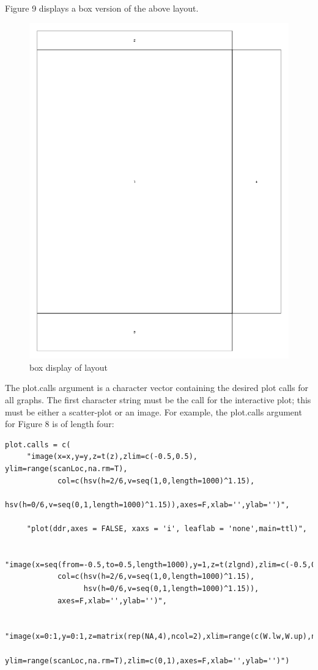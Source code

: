 \documentclass[]{article}
\begin{document}
\indent Figure 9 displays a box version of the above layout.
\begin{center}
\begin{figure}
\includegraphics{layoutFile}
\caption{box display of layout}
\end{figure}
\end{center}


\indent The plot.calls argument is a character vector containing the desired plot calls for all graphs. The first character string must be the call for the interactive plot; this must be either a scatter-plot or an image. For example, the plot.calls argument for Figure 8 is of length four: 


\begin{verbatim}
plot.calls = c(
     "image(x=x,y=y,z=t(z),zlim=c(-0.5,0.5), ylim=range(scanLoc,na.rm=T),
            col=c(hsv(h=2/6,v=seq(1,0,length=1000)^1.15),
            hsv(h=0/6,v=seq(0,1,length=1000)^1.15)),axes=F,xlab='',ylab='')",

     "plot(ddr,axes = FALSE, xaxs = 'i', leaflab = 'none',main=ttl)",

     "image(x=seq(from=-0.5,to=0.5,length=1000),y=1,z=t(zlgnd),zlim=c(-0.5,0.5),
            col=c(hsv(h=2/6,v=seq(1,0,length=1000)^1.15),
                  hsv(h=0/6,v=seq(0,1,length=1000)^1.15)),
            axes=F,xlab='',ylab='')",

     "image(x=0:1,y=0:1,z=matrix(rep(NA,4),ncol=2),xlim=range(c(W.lw,W.up),na.rm=T),
            ylim=range(scanLoc,na.rm=T),zlim=c(0,1),axes=F,xlab='',ylab='')")

\end{verbatim}
\end{document}
